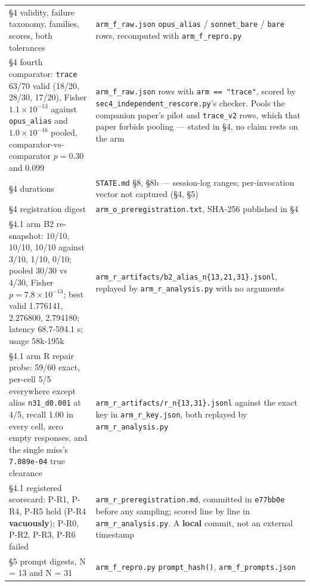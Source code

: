 \begin{longtable}{@{}p{}p{}@{}}
\S4 validity, failure taxonomy, families, scores, both tolerances &
\texttt{arm\_f\_raw.json} \texttt{opus\_alias} / \texttt{sonnet\_bare} / \texttt{bare} rows, recomputed with \texttt{arm\_f\_repro.py} \\

\S4 fourth comparator: \texttt{trace} 63/70 valid (18/20, 28/30, 17/20), Fisher $1.1\times10^{-13}$ against \texttt{opus\_alias} and $1.0\times10^{-16}$ pooled, comparator-vs-comparator $p = 0.30$ and $0.099$ &
\texttt{arm\_f\_raw.json} rows with \texttt{arm == "trace"}, scored by \texttt{sec4\_independent\_rescore.py}'s checker. Pools the companion paper's pilot and \texttt{trace\_v2} rows, which that paper forbids pooling --- stated in \S4, no claim rests on the arm \\

\S4 durations &
\texttt{STATE.md} \S8, \S8b --- session-log ranges; per-invocation vector not captured (\S4, \S5) \\

\S4 registration digest &
\texttt{arm\_o\_preregistration.txt}, SHA-256 published in \S4 \\

\S4.1 arm B2 re-snapshot: 10/10, 10/10, 10/10 against 3/10, 1/10, 0/10; pooled 30/30 vs 4/30, Fisher $p = 7.8\times10^{-13}$; best valid 1.776141, 2.276800, 2.794180; latency 68.7-594.1 s; usage 58k-195k &
\texttt{arm\_\bk{}r\_\bk{}artifacts/\bk{}b2\_\bk{}alias\_\bk{}n\{13,21,31\}.jsonl}, replayed by \texttt{arm\_r\_analysis.py} with no arguments \\

\S4.1 arm R repair probe: 59/60 exact, per-cell 5/5 everywhere except alias \texttt{n31\_d0.001} at 4/5, recall 1.00 in every cell, zero empty responses, and the single miss's \texttt{7.089e-04} true clearance &
\texttt{arm\_\bk{}r\_\bk{}artifacts/\bk{}r\_\bk{}n\{13,31\}.jsonl} against the exact key in \texttt{arm\_r\_key.json}, both replayed by \texttt{arm\_r\_analysis.py} \\

\S4.1 registered scorecard: P-R1, P-R4, P-R5 held (P-R4 \textbf{vacuously}); P-R0, P-R2, P-R3, P-R6 failed &
\texttt{arm\_r\_preregistration.md}, committed in \texttt{e77bb0e} before any sampling; scored line by line in \texttt{arm\_r\_analysis.py}. A \textbf{local} commit, not an external timestamp \\

\S5 prompt digests, N = 13 and N = 31 &
\texttt{arm\_f\_repro.py} \texttt{prompt\_hash()}, \texttt{arm\_f\_prompts.json} \\


\end{longtable}
